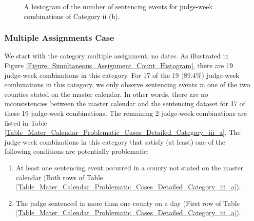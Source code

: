 \documentclass[11pt, oneside]{article}   	%
\theoremstyle{ModifiedStyle}
\begin{document}
\begin{figure}[H]
\begin{minipage}{0.45\textwidth}
					\vspace{-6mm}
					\caption{A histogram of the number of sentencing events for judge-week combinations of Category ii (b).}
					\label{Figure_Histogram_of_Sentences_This_Week_Category_11}
				\end{minipage}
			\end{figure}

		\subsubsection{Multiple Assignments Case}
			\label{Sec:Master_Calendar:Further_Analysis_of_Some_Assignments:Category_iii}
			We start with the category multiple assignment, no dates. As illustrated in Figure \ref{Figure_Simultaneous_Assignment_Count_Histogram}, there are 19 judge-week combinations in this category. For 17 of the 19 ($89.4\%$) judge-week combinations in this category, we only observe sentencing events in one of the two counties stated on the master calendar. In other words, there are no inconsistencies between the master calendar and the sentencing dataset for 17 of these 19 judge-week combinations. The remaining 2 judge-week combinations are listed in Table \ref{Table_Mater_Calendar_Problematic_Cases_Detailed_Category_iii_a}. The judge-week combinations in this category that satisfy (at least) one of the following conditions are potentially problematic:
			\begin{enumerate}
				\vspace{-3mm}
				\item At least one sentencing event occurred in a county not stated on the master calendar (Both rows of Table \ref{Table_Mater_Calendar_Problematic_Cases_Detailed_Category_iii_a}).
				\vspace{-2mm}
				\item The judge sentenced in more than one county on a day (First row of Table \ref{Table_Mater_Calendar_Problematic_Cases_Detailed_Category_iii_a}).
			\end{enumerate}
\end{document}
